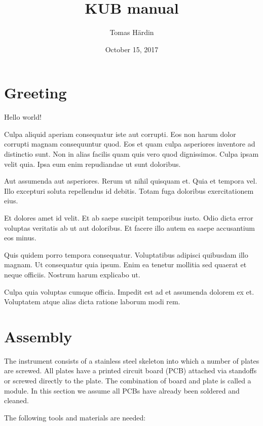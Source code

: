 \documentclass{article}
\begin{document}
\title{KUB manual}
\date{October 15, 2017}
\author{Tomas H\"ardin}

\maketitle

\newpage

\tableofcontents
\listoffigures
\listoftables

\newpage

\section{Greeting}
Hello world!



Culpa aliquid aperiam consequatur iste aut corrupti. Eos non harum dolor corrupti magnam consequuntur quod. Eos et quam culpa asperiores inventore ad distinctio sunt. Non in alias facilis quam quis vero quod dignissimos. Culpa ipsam velit quia. Ipsa eum enim repudiandae ut sunt doloribus.

Aut assumenda aut asperiores. Rerum ut nihil quisquam et. Quia et tempora vel. Illo excepturi soluta repellendus id debitis. Totam fuga doloribus exercitationem eius.

Et dolores amet id velit. Et ab saepe suscipit temporibus iusto. Odio dicta error voluptas veritatis ab ut aut doloribus. Et facere illo autem ea saepe accusantium eos minus.

Quis quidem porro tempora consequatur. Voluptatibus adipisci quibusdam illo magnam. Ut consequatur quia ipsum. Enim ea tenetur mollitia sed quaerat et neque officiis. Nostrum harum explicabo ut.

Culpa quia voluptas cumque officia. Impedit est ad et assumenda dolorem ex et. Voluptatem atque alias dicta ratione laborum modi rem.

\section{Assembly}


The instrument consists of a stainless steel skeleton into which a number of plates are screwed.
All plates have a printed circuit board (PCB) attached via standoffs or screwed directly to the plate.
The combination of board and plate is called a module.
In this section we assume all PCBs have already been soldered and cleaned.

The following tools and materials are needed:
\end{document}
